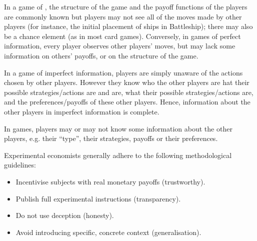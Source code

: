 \begin{definition}
	In a game of , the structure of the game and the payoff functions of the players are commonly known but players may not see all of the moves made by other players (for instance, the initial placement of ships in Battleship); there may also be a chance element (as in most card games). Conversely, in games of perfect information, every player observes other players' moves, but may lack some information on others' payoffs, or on the structure of the game.
\end{definition}

\begin{remark}  
In a game of imperfect information, players are simply unaware of the actions chosen by other
players. However they know who the other players are hat their possible strategies/actions are and are, what their possible strategies/actions are, and the preferences/payoffs of these other players. Hence, information about the other players in imperfect information is complete.

In  games, players may or may not know some information about the other players, e.g. their “type”, their strategies, payoffs or their preferences.	
\end{remark}

\begin{prop} 
Experimental economists generally adhere to the following methodological guidelines:
\begin{itemize}
	\item Incentivise subjects with real monetary payoffs (trustworthy).
	\item Publish full experimental instructions (transparency).
	\item Do not use deception (honesty).
	\item Avoid introducing specific, concrete context (generalisation).
\end{itemize}


\end{prop}


\newpage
